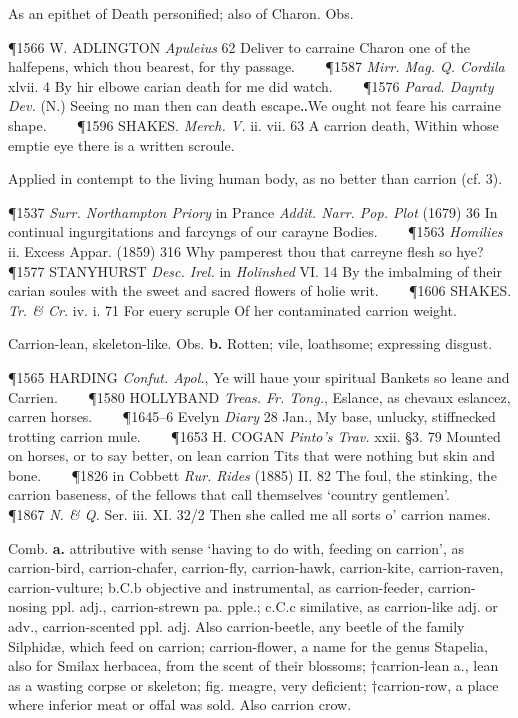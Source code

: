 \begin{description}[wide, labelwidth=!, labelindent=0pt]
\begin{myenumerate}
 As an epithet of Death personified; also of Charon. Obs.

\P 1566 W. ADLINGTON  \textit{Apuleius} 62 Deliver to carraine Charon one of the halfepens, which thou bearest, for thy passage.    
\P 1587 \textit{Mirr.  Mag. Q. Cordila} xlvii. 4 By hir elbowe carian death for me did watch.    
\P 1576 \textit{Parad.  Daynty Dev.} (N.) Seeing no man then can death escape‥We ought not feare his carraine shape.    
\P 1596 SHAKES.  \textit{Merch. V.} ii. vii. 63 A carrion death, Within whose emptie eye there is a written scroule.

 Applied in contempt to the living human body, as no better than carrion (cf. 3).

\P 1537 \textit{Surr.  Northampton Priory} in Prance \textit{Addit. Narr. Pop. Plot} (1679) 36 In continual ingurgitations and farcyngs of our carayne Bodies.    
\P 1563 \textit{Homilies}  ii. Excess Appar. (1859) 316 Why pamperest thou that carreyne flesh so hye?    
\P 1577 STANYHURST  \textit{Desc. Irel.} in \textit{Holinshed} VI. 14 By the imbalming of their carian soules with the sweet and sacred flowers of holie writ.    
\P 1606 SHAKES.  \textit{Tr. \& Cr.} iv. i. 71 For euery scruple Of her contaminated carrion weight.

 Carrion-lean, skeleton-like. Obs. \textbf{b.} Rotten; vile, loathsome; expressing disgust.

\P 1565 HARDING  \textit{Confut. Apol.}, Ye will haue your spiritual Bankets so leane and Carrien.    
\P 1580 HOLLYBAND  \textit{Treas. Fr. Tong.}, Eslance, as chevaux eslancez, carren horses.    
\P 1645–6 Evelyn \textit{Diary} 28 Jan., My base, unlucky, stiffnecked trotting carrion mule.    
\P 1653 H. COGAN  \textit{Pinto's Trav.} xxii. §3. 79 Mounted on horses, or to say better, on lean carrion Tits that were nothing but skin and bone.    
\P 1826 in Cobbett \textit{Rur. Rides} (1885) II. 82 The foul, the stinking, the carrion baseness, of the fellows that call themselves ‘country gentlemen’.    
\P 1867 \textit{N. \& Q.}  Ser. iii. XI. 32/2 Then she called me all sorts o' carrion names.

 Comb. \textbf{a.} attributive with sense ‘having to do with, feeding on carrion’, as carrion-bird, carrion-chafer, carrion-fly, carrion-hawk, carrion-kite, carrion-raven, carrion-vulture; b.C.b objective and instrumental, as carrion-feeder, carrion-nosing ppl. adj., carrion-strewn pa. pple.; c.C.c similative, as carrion-like adj. or adv., carrion-scented ppl. adj. Also carrion-beetle, any beetle of the family Silphidæ, which feed on carrion; carrion-flower, a name for the genus Stapelia, also for Smilax herbacea, from the scent of their blossoms; †carrion-lean a., lean as a wasting corpse or skeleton; fig. meagre, very deficient; †carrion-row, a place where inferior meat or offal was sold. Also carrion crow.


\end{myenumerate}
\end{description}
